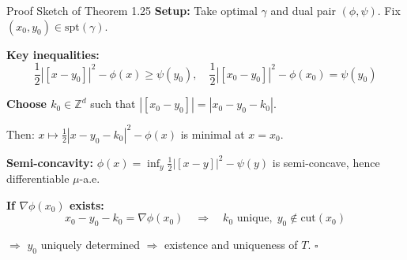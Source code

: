 \documentclass[aspectratio=169]{beamer}
\newcommand{\Z}{\mathbb{Z}}
\begin{document}
\begin{frame}{Proof Sketch of Theorem 1.25}
\textbf{Setup:} Take optimal $\gamma$ and dual pair $(\phi, \psi)$. Fix $(x_0, y_0) \in \text{spt}(\gamma)$.

\vspace{0.2cm}
\textbf{Key inequalities:}
\[
\frac{1}{2}|[x - y_0]|^2 - \phi(x) \geq \psi(y_0), \quad \frac{1}{2}|[x_0 - y_0]|^2 - \phi(x_0) = \psi(y_0)
\]

\vspace{0.2cm}
\textbf{Choose $k_0 \in \Z^d$} such that $|[x_0 - y_0]| = |x_0 - y_0 - k_0|$.

Then: $x \mapsto \frac{1}{2}|x - y_0 - k_0|^2 - \phi(x)$ is minimal at $x = x_0$.

\vspace{0.2cm}
\textbf{Semi-concavity:} $\phi(x) = \inf_y \frac{1}{2}|[x-y]|^2 - \psi(y)$ is semi-concave, hence differentiable $\mu$-a.e.

\vspace{0.2cm}
\textbf{If $\nabla\phi(x_0)$ exists:}
\[
x_0 - y_0 - k_0 = \nabla\phi(x_0) \quad \Rightarrow \quad k_0 \text{ unique}, \; y_0 \notin \text{cut}(x_0)
\]

$\Rightarrow$ $y_0$ uniquely determined $\Rightarrow$ existence and uniqueness of $T$. \hfill $\square$
\end{frame}
\end{document}
